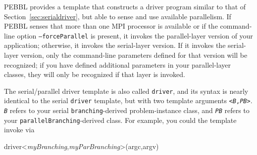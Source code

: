 
PEBBL provides a template that constructs a driver program similar to
that of Section~\ref{sec:serialdriver}, but able to sense and use
available parallelism.  If PEBBL senses that more than one MPI
processor is available or if the
command-line option \texttt{--forceParallel} is present, it invokes
the parallel-layer version of your application; otherwise, it invokes
the serial-layer version.  If it invokes the serial-layer version,
only the command-line parameters defined for that version will be
recognized; if you have defined additional parameters in your
parallel-layer classes, they will only be recognized if that layer is
invoked. 

The serial/parallel driver template is also called
\texttt{driver}, and its syntax is nearly identical to the serial
\texttt{driver} template, but with two template arguments
\texttt{<\emph{B},\emph{PB}>}.  \texttt{\emph{B}} refers to your serial
\texttt{branching}-derived problem-instance class, and \texttt{\emph{PB}}
refers to your \texttt{parallelBranching}-derived class.  For example,
you could the template invoke via
\begin{codeblock}
driver<\emph{myBranching},\emph{myParBranching}>(argc,argv)
\end{codeblock}

